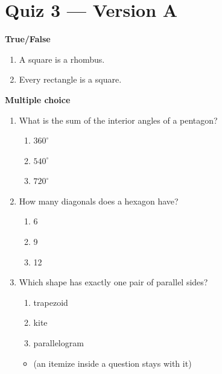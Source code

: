 \documentclass{article}
\begin{document}
\section*{Quiz 3 --- Version A}

\textbf{True/False}
\begin{enumerate}
  \item A square is a rhombus.
  \item Every rectangle is a square.
\end{enumerate}

\textbf{Multiple choice}
\begin{enumerate}[resume]
  \item What is the sum of the interior angles of a pentagon?
  \begin{enumerate}[label=(\Alph*)]
    \item $360^\circ$
    \item $540^\circ$
    \item $720^\circ$
  \end{enumerate}

  \item How many diagonals does a hexagon have?
  \begin{enumerate}[label=(\Alph*)]
    \item 6
    \item 9
    \item 12
  \end{enumerate}

  \item Which shape has exactly one pair of parallel sides?
  \begin{enumerate}[label=(\Alph*)]
    \item trapezoid
    \item kite
    \item parallelogram
  \end{enumerate}
  \begin{itemize}
    \item (an itemize inside a question stays with it)
  \end{itemize}
\end{enumerate}
\end{document}
